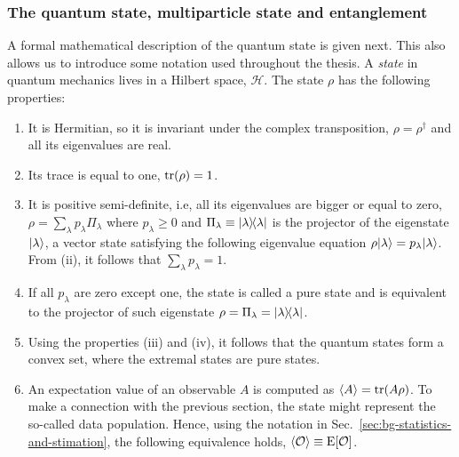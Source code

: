\subsubsection{The quantum state, multiparticle state and entanglement}
\label{sec:bg-the-quantu-state}

A formal mathematical description of the quantum state is given next.
This also allows us to introduce some notation used throughout the thesis.
A \emph{state} in quantum mechanics lives in a Hilbert space, $\mathcal{H}$.
The state $\rho$ has the following properties:
\begin{enumerate}
  \item
  It is Hermitian, so it is invariant under the complex transposition, $\rho=\rho^\dagger$ and all its eigenvalues are real.
  \item Its trace is equal to one, $\operatorname{tr}(\rho)=1$.
  \item It is positive semi-definite, i.e, all its eigenvalues are bigger or equal to zero, $\rho=\sum_{\lambda}p_\lambda \Pi_\lambda$ where $p_\lambda\geqslant 0$ and $\Pi_\lambda\equiv\vert{\lambda}\rangle{\!}\langle{\lambda}\vert$ is the projector of the eigenstate $\vert{\lambda}\rangle$, a vector state satisfying the following eigenvalue equation $\rho\vert{\lambda}\rangle=p_{\lambda}\vert{\lambda}\rangle$.
  From (ii), it follows that $\sum_\lambda p_\lambda = 1$.
  \item If all $p_\lambda$ are zero except one, the state is called a pure state and is equivalent to the projector of such eigenstate $\rho=\Pi_\lambda=\vert{\lambda}\rangle{\!}\langle{\lambda}\vert$.
  \item Using the properties (iii) and (iv), it follows that the quantum states form a convex set, where the extremal states are pure states.
  \item An expectation value of an observable $A$ is computed as $\langle{A}\rangle=\operatorname{tr}(A\rho)$.
  To make a connection with the previous section, the state might represent the so-called data population. Hence, using the notation in Sec.~\ref{sec:bg-statistics-and-stimation}, the following equivalence holds, $\langle{\mathcal{O}}\rangle\equiv\text{E}[\mathcal{O}]$.
\end{enumerate}

